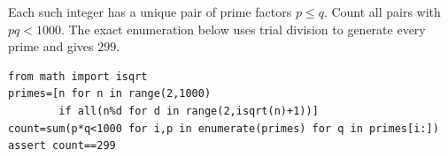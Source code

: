 Each such integer has a unique pair of prime factors $p\le q$. Count all pairs with $pq<1000$. The exact enumeration below uses trial division to generate every prime and gives $\boxed{299}$.\begin{verbatim}
from math import isqrt
primes=[n for n in range(2,1000)
        if all(n%d for d in range(2,isqrt(n)+1))]
count=sum(p*q<1000 for i,p in enumerate(primes) for q in primes[i:])
assert count==299
\end{verbatim}
